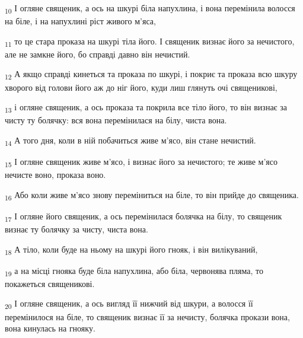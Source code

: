 \begin{tcolorbox}
\textsubscript{10} І огляне священик, а ось на шкурі біла напухлина, і вона перемінила волосся на біле, і на напухлині ріст живого м'яса,
\end{tcolorbox}
\begin{tcolorbox}
\textsubscript{11} то це стара проказа на шкурі тіла його. І священик визнає його за нечистого, але не замкне його, бо справді давно він нечистий.
\end{tcolorbox}
\begin{tcolorbox}
\textsubscript{12} А якщо справді кинеться та проказа по шкурі, і покриє та проказа всю шкуру хворого від голови його аж до ніг його, куди лиш глянуть очі священикові,
\end{tcolorbox}
\begin{tcolorbox}
\textsubscript{13} і огляне священик, а ось проказа та покрила все тіло його, то він визнає за чисту ту болячку: вся вона перемінилася на білу, чиста вона.
\end{tcolorbox}
\begin{tcolorbox}
\textsubscript{14} А того дня, коли в ній побачиться живе м'ясо, він стане нечистий.
\end{tcolorbox}
\begin{tcolorbox}
\textsubscript{15} І огляне священик живе м'ясо, і визнає його за нечистого; те живе м'ясо нечисте воно, проказа воно.
\end{tcolorbox}
\begin{tcolorbox}
\textsubscript{16} Або коли живе м'ясо знову переміниться на біле, то він прийде до священика.
\end{tcolorbox}
\begin{tcolorbox}
\textsubscript{17} І огляне його священик, а ось перемінилася болячка на білу, то священик визнає ту болячку за чисту, чиста вона.
\end{tcolorbox}
\begin{tcolorbox}
\textsubscript{18} А тіло, коли буде на ньому на шкурі його гнояк, і він вилікуваний,
\end{tcolorbox}
\begin{tcolorbox}
\textsubscript{19} а на місці гнояка буде біла напухлина, або біла, червонява пляма, то покажеться священикові.
\end{tcolorbox}
\begin{tcolorbox}
\textsubscript{20} І огляне священик, а ось вигляд її нижчий від шкури, а волосся її перемінилося на біле, то священик визнає її за нечисту, болячка прокази вона, вона кинулась на гнояку.
\end{tcolorbox}
